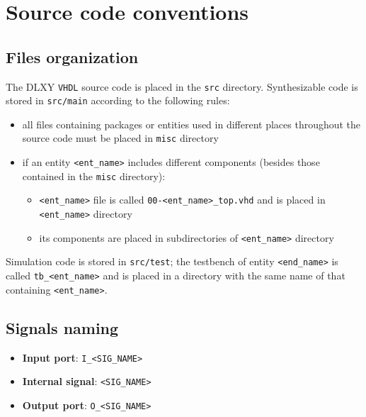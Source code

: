 \chapter{Source code conventions}
\label{app:code_conventions}

\section{Files organization}
The DLXY \texttt{VHDL} source code is placed in the \texttt{src} directory.
Synthesizable code is stored in \texttt{src/main} according to the following rules:
\begin{itemize}
	\item all files containing packages or entities used in different places
		throughout the source code must be placed in \texttt{misc} directory
	\item if an entity \texttt{<ent\_name>} includes different components
		(besides those contained in the \texttt{misc} directory):
		\begin{itemize}
			\item \texttt{<ent\_name>} file is called \texttt{00-<ent\_name>\_top.vhd}
				and is placed in \texttt{<ent\_name>} directory
			\item its components are placed in subdirectories of \texttt{<ent\_name>}
				directory
		\end{itemize}
\end{itemize}

Simulation code is stored in \texttt{src/test}; the testbench of entity
\texttt{<end\_name>} is called \texttt{tb\_<ent\_name>} and is placed in a
directory with the same name of that containing \texttt{<ent\_name>}.

\section{Signals naming}
\begin{itemize}
	\item \textbf{Input port}: \texttt{I\_<SIG\_NAME>}
	\item \textbf{Internal signal}: \texttt{<SIG\_NAME>}
	\item \textbf{Output port}: \texttt{O\_<SIG\_NAME>}
\end{itemize}

